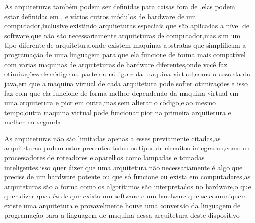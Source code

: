 \documentclass[
	12pt,				%
	openright,			%
	oneside,			%
	a4paper,			%
	english,			%
	french,				%
	spanish,			%
	brazil,				%
	]{abntex2}
\begin{document}
As arquiteturas também podem ser definidas para coisas fora de ,elas podem estar definidas em , e vários outros módulos de hardware de um computador,inclusive existindo arquiteturas especiais que são aplicadas a nível de software,que não são necessariamente arquiteturas de computador,mas sim um tipo diferente de arquitetura,onde existem maquinas abstratas que simplificam a programação de uma linguagem para que ela funcione de forma mais compatível com varias maquinas de arquiteturas de hardware diferentes,onde você faz otimizações de código na parte do código e da maquina virtual,como o caso da  do java,em que a maquina virtual de cada arquitetura pode sofrer otimizações e isso faz com que ela funcione de forma melhor dependendo da maquina virtual em uma arquitetura e pior em outra,mas sem alterar o código,e ao mesmo tempo,outra maquina virtual pode funcionar pior na primeira arquitetura e melhor na segunda.\newline

As arquiteturas não são limitadas apenas a esses previamente citados,as arquiteturas podem estar presentes todos os tipos de circuitos integrados,como os processadores de roteadores e aparelhos  como lampadas e tomadas inteligentes.isso quer dizer que uma arquitetura não necessariamente é algo que precise de um hardware potente ou que só funcione ou exista em computadores,as arquiteturas são a forma como os algorítimos são interpretados no hardware,o que quer dizer que dês de que exista um software e um hardware que se comuniquem existe uma arquitetura e provavelmente houve uma conversão da linguagem de programação para a linguagem de maquina dessa arquitetura deste dispositivo\newline
\end{document}
